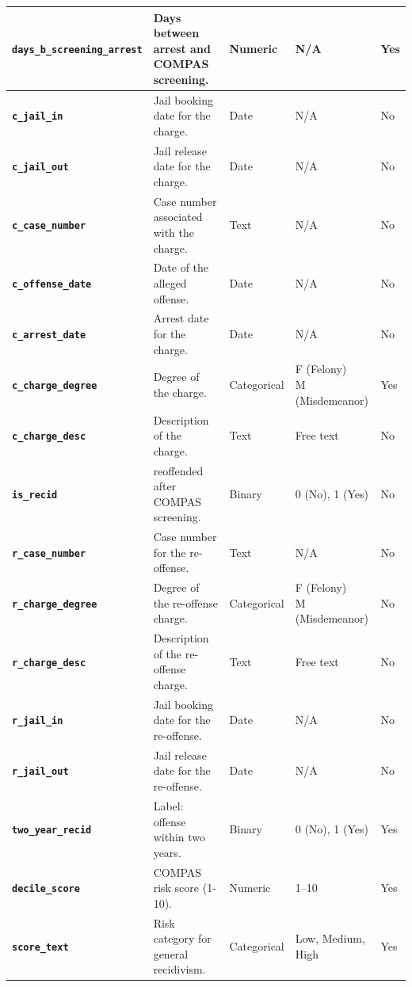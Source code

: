 \documentclass[conference]{IEEEtran}
\begin{document}
\begin{table}[!ht]
\begin{tabular}{|l|l|l|l|l|}
		\textbf{\texttt{days\_b\_screening\_arrest}}	&	Days between arrest and COMPAS screening.	&	Numeric	&	N/A	&	Yes \\ \hline
		\textbf{\texttt{c\_jail\_in}}	&	Jail booking date for the charge.	&	Date	&	N/A	&	No \\ \hline
		\textbf{\texttt{c\_jail\_out}}	&	Jail release date for the charge.	&	Date	&	N/A	&	No \\ \hline
		\textbf{\texttt{c\_case\_number}}	&	Case number associated with the charge.	&	Text	&	N/A	&	No \\ \hline
		\textbf{\texttt{c\_offense\_date}}	&	Date of the alleged offense.	&	Date	&	N/A	&	No \\ \hline
		\textbf{\texttt{c\_arrest\_date}}	&	Arrest date for the charge.	&	Date	&	N/A	&	No \\ \hline
		\textbf{\texttt{c\_charge\_degree}}	&	Degree of the charge.	&	Categorical	&	\makecell[l]{F (Felony)\\M (Misdemeanor)}	&	Yes \\ \hline
		\textbf{\texttt{c\_charge\_desc}}	&	Description of the charge.	&	Text	&	Free text	&	No \\ \hline
		\textbf{\texttt{is\_recid}}	&	reoffended after COMPAS screening.	&	Binary	&	0 (No), 1 (Yes)	&	No \\ \hline
		\textbf{\texttt{r\_case\_number}}	&	Case number for the re-offense.	&	Text	&	N/A	&	No \\ \hline
		\textbf{\texttt{r\_charge\_degree}}	&	Degree of the re-offense charge.	&	Categorical	&	\makecell[l]{F (Felony)\\M (Misdemeanor)}	&	No \\ \hline
		\textbf{\texttt{r\_charge\_desc}}	&	Description of the re-offense charge.	&	Text	&	Free text	&	No \\ \hline
		\textbf{\texttt{r\_jail\_in}}	&	Jail booking date for the re-offense.	&	Date	&	N/A	&	No \\ \hline
		\textbf{\texttt{r\_jail\_out}}	&	Jail release date for the re-offense.	&	Date	&	N/A	&	No \\ \hline
		\textbf{\texttt{two\_year\_recid}}	&	Label: offense within two years.	&	Binary	&	0 (No), 1 (Yes)	&	Yes \\ \hline
		\textbf{\texttt{decile\_score}}	&	COMPAS risk score (1-10).	&	Numeric	&	1–10	&	Yes \\ \hline
		\textbf{\texttt{score\_text}}	&	Risk category for general recidivism.	&	Categorical	&	Low, Medium, High	&	Yes \\ \hline

\end{tabular}
\end{table}
\end{document}
